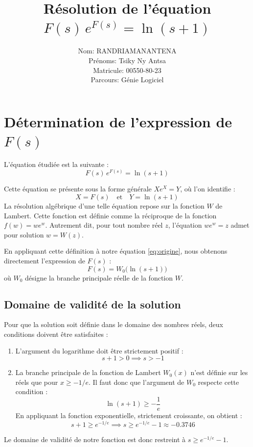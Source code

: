 \documentclass[french]{article}
\title{Résolution de l'équation \(F(s)\,e^{F(s)} = \ln(s+1)\)}
\author{Nom: RANDRIAMANANTENA \\
Prénoms: Tsiky Ny Antsa \\
Matricule: 00550-80-23 \\
Parcours: Génie Logiciel}
\date{}
\begin{document}
\maketitle

\section{Détermination de l'expression de \(F(s)\)}

L'équation étudiée est la suivante :
\begin{equation}\label{eq:origine}
F(s)\,e^{F(s)} = \ln(s+1)
\end{equation}

Cette équation se présente sous la forme générale \(X e^X = Y\), où l'on identifie :
\[
X = F(s) \quad \text{et} \quad Y = \ln(s+1)
\]
La résolution algébrique d'une telle équation repose sur la fonction \(W\) de Lambert. Cette fonction est définie comme la réciproque de la fonction \(f(w) = w e^w\). Autrement dit, pour tout nombre réel \(z\), l'équation \(w e^w = z\) admet pour solution \(w = W(z)\).

En appliquant cette définition à notre équation \eqref{eq:origine}, nous obtenons directement l'expression de \(F(s)\) :
\begin{equation}
\boxed{F(s) = W_0\!\bigl(\ln(s+1)\bigr)}
\end{equation}
où \(W_0\) désigne la branche principale réelle de la fonction \(W\).

\subsection*{Domaine de validité de la solution}
Pour que la solution soit définie dans le domaine des nombres réels, deux conditions doivent être satisfaites :
\begin{enumerate}
    \item L'argument du logarithme doit être strictement positif :
    \[
    s + 1 > 0 \implies s > -1
    \]
    \item La branche principale de la fonction de Lambert \(W_0(x)\) n'est définie sur les réels que pour \(x \ge -1/e\). Il faut donc que l'argument de \(W_0\) respecte cette condition :
    \[
    \ln(s+1) \ge -\frac{1}{e}
    \]
    En appliquant la fonction exponentielle, strictement croissante, on obtient :
    \[
    s + 1 \ge e^{-1/e} \implies s \ge e^{-1/e} - 1 \approx -0.3746
    \]
\end{enumerate}
Le domaine de validité de notre fonction est donc restreint à \(s \ge e^{-1/e} - 1\).
\end{document}
